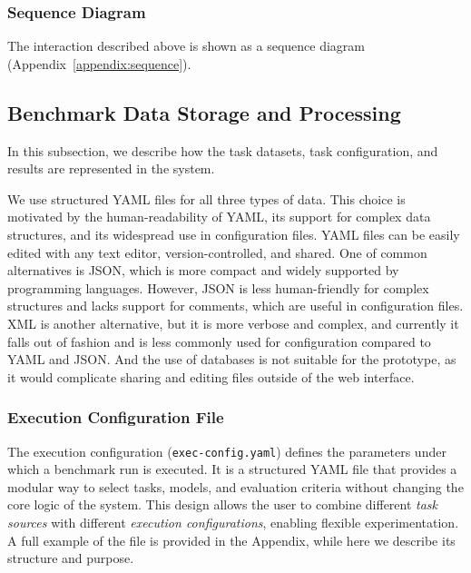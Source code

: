 \subsubsection{Sequence Diagram}

The interaction described above is shown as a sequence diagram (Appendix~\ref{appendix:sequence}).

\subsection{Benchmark Data Storage and Processing}

In this subsection, we describe how the task datasets, task configuration, and results are represented in the system.

We use structured YAML files for all three types of data.
This choice is motivated by the human-readability of YAML, its support for complex data structures, and its widespread use in configuration files.
YAML files can be easily edited with any text editor, version-controlled, and shared.
One of common alternatives is JSON, which is more compact and widely supported by programming languages.
However, JSON is less human-friendly for complex structures and lacks support for comments, which are useful in configuration files.
XML is another alternative, but it is more verbose and complex, and currently it falls out of fashion and is less commonly used for configuration compared to YAML and JSON.
And the use of databases is not suitable for the prototype, as it would complicate sharing and editing files outside of the web interface.

\subsubsection{Execution Configuration File}

The execution configuration (\texttt{exec-config.yaml}) defines the parameters under which a benchmark run is executed.
It is a structured YAML file that provides a modular way to select tasks, models, and evaluation criteria without changing the core logic of the system.
This design allows the user to combine different \emph{task sources} with different \emph{execution configurations}, enabling flexible experimentation.
A full example of the file is provided in the Appendix, while here we describe its structure and purpose.

